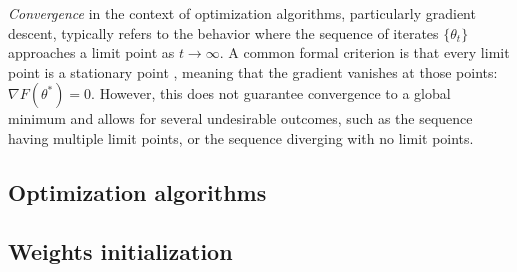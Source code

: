 \begin{definition}
  \textit{Convergence} \autocite{sun2020optimization} in the context of optimization algorithms, particularly gradient descent, typically refers to the behavior where the sequence of iterates $\{\theta_t\}$ approaches a limit point as $t \rightarrow \infty$. A common formal criterion is that every limit point is a stationary point \autocite{bertsekas1997nonlinear}, meaning that the gradient vanishes at those points: $\nabla F(\theta^*) = 0$. However, this does not guarantee convergence to a global minimum and allows for several undesirable outcomes, such as the sequence having multiple limit points, or the sequence diverging with no limit points.
\end{definition}
\subsection{Optimization algorithms}
\subsection{Weights initialization}
